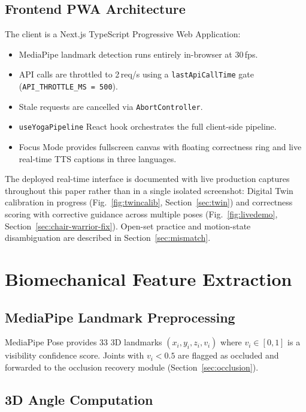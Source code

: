 \documentclass[conference]{IEEEtran}
\begin{document}
\subsection{Frontend PWA Architecture}

The client is a Next.js TypeScript Progressive Web Application:
\begin{itemize}
\item MediaPipe landmark detection runs entirely in-browser at 30\,fps.
\item API calls are throttled to 2\,req/s using a \texttt{lastApiCallTime} gate
  (\texttt{API\_THROTTLE\_MS = 500}).
\item Stale requests are cancelled via \texttt{AbortController}.
\item \texttt{useYogaPipeline} React hook orchestrates the full client-side pipeline.
\item Focus Mode provides fullscreen canvas with floating correctness ring and live
  real-time TTS captions in three languages.
\end{itemize}

The deployed real-time interface is documented with live production captures
throughout this paper rather than in a single isolated screenshot: Digital Twin
calibration in progress (Fig.~\ref{fig:twincalib}, Section~\ref{sec:twin}) and
correctness scoring with corrective guidance across multiple poses
(Fig.~\ref{fig:livedemo}, Section~\ref{sec:chair-warrior-fix}). Open-set
practice and motion-state disambiguation are described in
Section~\ref{sec:mismatch}.

\section{Biomechanical Feature Extraction}
\label{sec:feature}

\subsection{MediaPipe Landmark Preprocessing}

MediaPipe Pose provides 33 3D landmarks $(x_i, y_i, z_i, v_i)$ where $v_i \in [0,1]$
is a visibility confidence score. Joints with $v_i < 0.5$ are flagged as occluded and
forwarded to the occlusion recovery module (Section~\ref{sec:occlusion}).

\subsection{3D Angle Computation}
\end{document}
